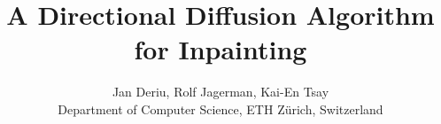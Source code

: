 \documentclass[10pt,conference,compsocconf]{IEEEtran}
\begin{document}
\title{A Directional Diffusion Algorithm for Inpainting}

\author{
  Jan Deriu, Rolf Jagerman, Kai-En Tsay\\
  Department of Computer Science, ETH Zürich, Switzerland
}

\maketitle


















\end{document}
